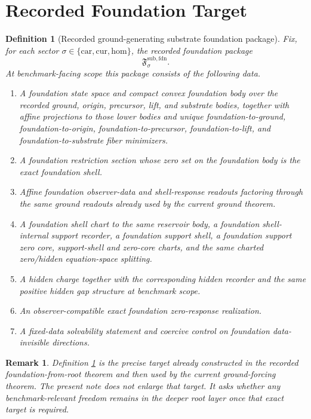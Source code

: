 \documentclass[11pt]{article}
\newcommand{\Car}{\mathrm{car}}
\newcommand{\Cur}{\mathrm{cur}}
\newcommand{\Hom}{\mathrm{hom}}
\newcommand{\FoundationPackage}{\mathfrak F^{\mathrm{sub,fdn}}}
\newtheorem{definition}{Definition}
\newtheorem{remark}{Remark}
\begin{document}
\section{Recorded Foundation Target}

\begin{definition}[Recorded ground-generating substrate foundation package]
\label{def:foundation}
Fix, for each sector \(\sigma\in\{\Car,\Cur,\Hom\}\), the recorded foundation package
\[
\FoundationPackage_{\sigma}.
\]
At benchmark-facing scope this package consists of the following data.
\begin{enumerate}
    \item A foundation state space and compact convex foundation body over the recorded ground, origin, precursor, lift, and substrate bodies, together with affine projections to those lower bodies and unique foundation-to-ground, foundation-to-origin, foundation-to-precursor, foundation-to-lift, and foundation-to-substrate fiber minimizers.
    \item A foundation restriction section whose zero set on the foundation body is the exact foundation shell.
    \item Affine foundation observer-data and shell-response readouts factoring through the same ground readouts already used by the current ground theorem.
    \item A foundation shell chart to the same reservoir body, a foundation shell-internal support recorder, a foundation support shell, a foundation support zero core, support-shell and zero-core charts, and the same charted zero/hidden equation-space splitting.
    \item A hidden charge together with the corresponding hidden recorder and the same positive hidden gap structure at benchmark scope.
    \item An observer-compatible exact foundation zero-response realization.
    \item A fixed-data solvability statement and coercive control on foundation data-invisible directions.
\end{enumerate}
\end{definition}

\begin{remark}
Definition \ref{def:foundation} is the precise target already constructed in the recorded foundation-from-root theorem and then used by the current ground-forcing theorem. The present note does not enlarge that target. It asks whether any benchmark-relevant freedom remains in the deeper root layer once that exact target is required.
\end{remark}
\end{document}
